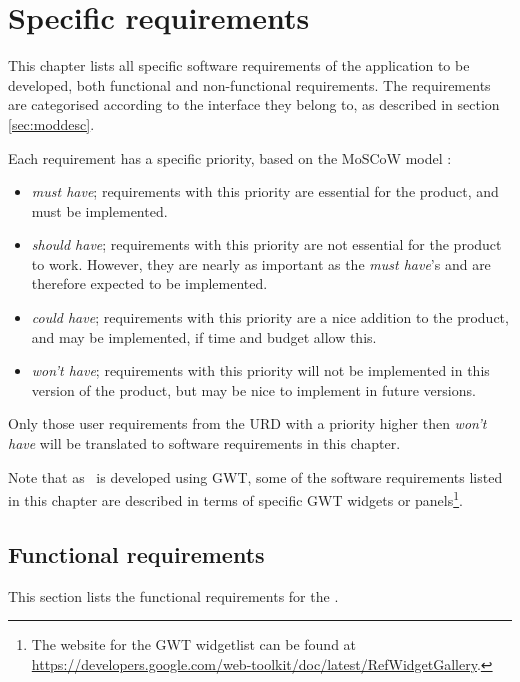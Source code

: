 \chapter{Specific requirements}
\label{chap:specreq}
This chapter lists all specific software requirements of the application to be developed, both functional and non-functional requirements. The requirements are categorised according to the interface they belong to, as described in section \ref{sec:moddesc}.

Each requirement has a specific priority, based on the MoSCoW model \cite{moscow}:

\begin{itemize}
    \item \emph{must have}; requirements with this priority are essential for the product, and must be implemented.
    \item \emph{should have}; requirements with this priority are not essential for the product to work. However, they are nearly as important as the \emph{must have}'s and are therefore expected to be implemented.
    \item \emph{could have}; requirements with this priority are a nice addition to the product, and may be implemented, if time and budget allow this.
    \item \emph{won't have}; requirements with this priority will not be implemented in this version of the product, but may be nice to implement in future versions.
\end{itemize}

Only those user requirements from the URD \cite{urd} with a priority higher then \emph{won't have} will be translated to software requirements in this chapter.

Note that as \applicationname\ is developed using GWT, some of the software requirements listed in this chapter are described in terms of specific GWT widgets or panels\footnote{The website for the GWT widgetlist can be found at \url{https://developers.google.com/web-toolkit/doc/latest/RefWidgetGallery}.}.

\section{Functional requirements}
\label{sec:funcreq}
This section lists the functional requirements for the \applicationname.

